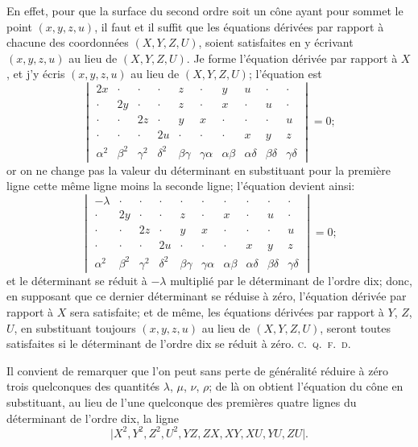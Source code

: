 \documentclass[11pt,a4paper]{article}
\begin{document}
En effet, pour que la surface du second ordre soit un c\^{o}ne ayant pour sommet le point $(x, y, z, u)$, il faut et il suffit que les \'{e}quations d\'{e}riv\'{e}es par rapport \`{a} chacune des coordonn\'{e}es $(X, Y, Z, U)$, soient satisfaites en y \'{e}crivant $(x, y, z, u)$ au lieu de $(X, Y, Z, U)$. Je forme l'\'{e}quation d\'{e}riv\'{e}e par rapport \`{a} $X$, et j'y \'{e}cris $(x, y, z, u)$ au lieu de $(X, Y, Z, U)$; l'\'{e}quation est
\[
\begin{vmatrix}
2x & \cdot & \cdot & \cdot & z & \cdot & y & u & \cdot & \cdot \\
\cdot & 2y & \cdot & \cdot & z & \cdot & x & \cdot & u & \cdot \\
\cdot & \cdot & 2z & \cdot & y & x & \cdot & \cdot & \cdot & u \\
\cdot & \cdot & \cdot & 2u & \cdot & \cdot & \cdot & x & y & z \\
\alpha^2 & \beta^2 & \gamma^2 & \delta^2 & \beta\gamma & \gamma\alpha & \alpha\beta & \alpha\delta & \beta\delta & \gamma\delta
\end{vmatrix}
= 0;
\]
or on ne change pas la valeur du d\'{e}terminant en substituant pour la premi\`{e}re ligne cette m\^{e}me ligne moins la seconde ligne; l'\'{e}quation devient ainsi:
\[
\begin{vmatrix}
-\lambda & \cdot & \cdot & \cdot & \cdot & \cdot & \cdot & \cdot & \cdot & \cdot \\
\cdot & 2y & \cdot & \cdot & z & \cdot & x & \cdot & u & \cdot \\
\cdot & \cdot & 2z & \cdot & y & x & \cdot & \cdot & \cdot & u \\
\cdot & \cdot & \cdot & 2u & \cdot & \cdot & \cdot & x & y & z \\
\alpha^2 & \beta^2 & \gamma^2 & \delta^2 & \beta\gamma & \gamma\alpha & \alpha\beta & \alpha\delta & \beta\delta & \gamma\delta
\end{vmatrix}
= 0;
\]
et le d\'{e}terminant se r\'{e}duit \`{a} $-\lambda$ multipli\'{e} par le d\'{e}terminant de l'ordre dix; donc, en supposant que ce dernier d\'{e}terminant se r\'{e}duise \`{a} z\'{e}ro, l'\'{e}quation d\'{e}riv\'{e}e par rapport \`{a} $X$ sera satisfaite; et de m\^{e}me, les \'{e}quations d\'{e}riv\'{e}es par rapport \`{a} $Y$, $Z$, $U$, en substituant toujours $(x, y, z, u)$ au lieu de $(X, Y, Z, U)$, seront toutes satisfaites si le d\'{e}terminant de l'ordre dix se r\'{e}duit \`{a} z\'{e}ro. \textsc{c.~q.~f.~d.}

Il convient de remarquer que l'on peut sans perte de g\'{e}n\'{e}ralit\'{e} r\'{e}duire \`{a} z\'{e}ro trois quelconques des quantit\'{e}s $\lambda$, $\mu$, $\nu$, $\rho$; de l\`{a} on obtient l'\'{e}quation du c\^{o}ne en substituant, au lieu de l'une quelconque des premi\`{e}res quatre lignes du d\'{e}terminant de l'ordre dix, la ligne
\[
\lvert X^2, Y^2, Z^2, U^2, YZ, ZX, XY, XU, YU, ZU \rvert.
\]
\end{document}
